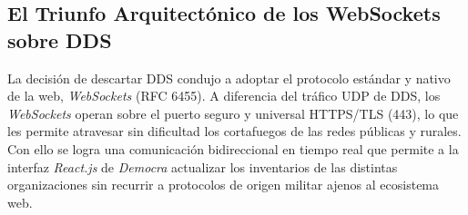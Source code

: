 \subsection{El Triunfo Arquitectónico de los WebSockets sobre DDS}

La decisión de descartar DDS condujo a adoptar el protocolo estándar y nativo de la
web, \textit{WebSockets} (RFC 6455). A diferencia del tráfico UDP de DDS, los
\textit{WebSockets} operan sobre el puerto seguro y universal HTTPS/TLS (443), lo que
les permite atravesar sin dificultad los cortafuegos de las redes públicas y
rurales. Con ello se logra una comunicación bidireccional en tiempo real que permite
a la interfaz \textit{React.js} de \textit{Democra} actualizar los inventarios de las
distintas organizaciones sin recurrir a protocolos de origen militar ajenos al
ecosistema web.
